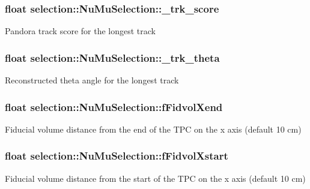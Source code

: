 \subsubsection[{\texorpdfstring{\+\_\+trk\+\_\+score}{_trk_score}}]{\setlength{\rightskip}{0pt plus 5cm}float selection\+::\+Nu\+Mu\+Selection\+::\+\_\+trk\+\_\+score\hspace{0.3cm}{\ttfamily [private]}}\hypertarget{classselection_1_1NuMuSelection_a2316596a59c6b87ea5aa75716c588117}{}\label{classselection_1_1NuMuSelection_a2316596a59c6b87ea5aa75716c588117}
Pandora track score for the longest track 
\subsubsection[{\texorpdfstring{\+\_\+trk\+\_\+theta}{_trk_theta}}]{\setlength{\rightskip}{0pt plus 5cm}float selection\+::\+Nu\+Mu\+Selection\+::\+\_\+trk\+\_\+theta\hspace{0.3cm}{\ttfamily [private]}}\hypertarget{classselection_1_1NuMuSelection_a2041fd7980c1dbe98ce5a4c77a305167}{}\label{classselection_1_1NuMuSelection_a2041fd7980c1dbe98ce5a4c77a305167}
Reconstructed theta angle for the longest track 
\subsubsection[{\texorpdfstring{f\+Fidvol\+Xend}{fFidvolXend}}]{\setlength{\rightskip}{0pt plus 5cm}float selection\+::\+Nu\+Mu\+Selection\+::f\+Fidvol\+Xend\hspace{0.3cm}{\ttfamily [private]}}\hypertarget{classselection_1_1NuMuSelection_ab57daae1ee3ed13b58016eb68f0d6712}{}\label{classselection_1_1NuMuSelection_ab57daae1ee3ed13b58016eb68f0d6712}
Fiducial volume distance from the end of the T\+PC on the x axis (default 10 cm) 
\subsubsection[{\texorpdfstring{f\+Fidvol\+Xstart}{fFidvolXstart}}]{\setlength{\rightskip}{0pt plus 5cm}float selection\+::\+Nu\+Mu\+Selection\+::f\+Fidvol\+Xstart\hspace{0.3cm}{\ttfamily [private]}}\hypertarget{classselection_1_1NuMuSelection_a5f015a245b7a149756f787f2dab9fcc7}{}\label{classselection_1_1NuMuSelection_a5f015a245b7a149756f787f2dab9fcc7}
Fiducial volume distance from the start of the T\+PC on the x axis (default 10 cm) 
